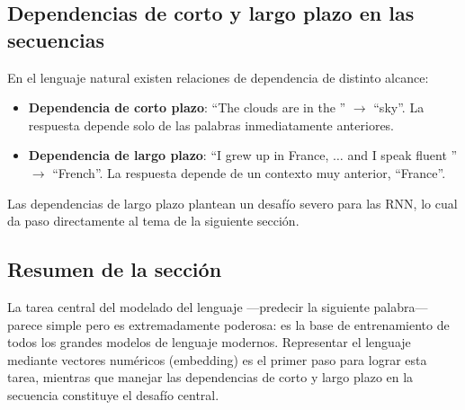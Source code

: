\subsection{Dependencias de corto y largo plazo en las secuencias}

En el lenguaje natural existen relaciones de dependencia de distinto alcance:

\begin{itemize}
    \item \textbf{Dependencia de corto plazo}: ``The clouds are in the \underline{\hspace{1cm}}'' $\rightarrow$ ``sky''. La respuesta depende solo de las palabras inmediatamente anteriores.
    \item \textbf{Dependencia de largo plazo}: ``I grew up in France, $\ldots$ and I speak fluent \underline{\hspace{1cm}}'' $\rightarrow$ ``French''. La respuesta depende de un contexto muy anterior, ``France''.
\end{itemize}

Las dependencias de largo plazo plantean un desafío severo para las RNN, lo cual da paso directamente al tema de la siguiente sección.

\subsection{Resumen de la sección}

La tarea central del modelado del lenguaje —predecir la siguiente palabra— parece simple pero es extremadamente poderosa: es la base de entrenamiento de todos los grandes modelos de lenguaje modernos. Representar el lenguaje mediante vectores numéricos (embedding) es el primer paso para lograr esta tarea, mientras que manejar las dependencias de corto y largo plazo en la secuencia constituye el desafío central.

\newpage
